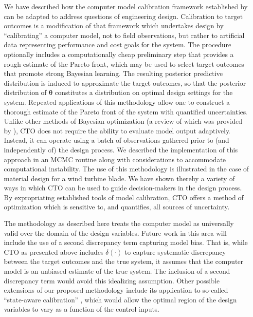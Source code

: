 \documentclass[12pt]{article}
\begin{document}
We have described how the 
computer model calibration framework established by \cite{Kennedy2001} can be adapted to address questions of engineering design. 
%
Calibration to target outcomes is a modification of that framework which undertakes design by ``calibrating'' a computer model, not to field observations, but rather to artificial data representing performance and cost goals for the system. 
%
The procedure optionally includes a computationally cheap preliminary step that provides a rough estimate of the Pareto front, which may be used to select target outcomes that promote strong Bayesian learning.
%
The resulting posterior predictive distribution is induced to approximate the target outcomes, so that the posterior distribution of $\boldsymbol\theta$ constitutes a distribution on optimal design settings for the system.
%
Repeated applications of this methodology allow one to construct a thorough estimate of the Pareto front of the system with quantified uncertainties.
%
Unlike other methods of Bayesian optimization (a review of which was provided by \citealt{Shahriari2016}), CTO does not require the ability to evaluate model output adaptively.
%
Instead, it can operate using a batch of observations gathered prior to (and independently of) the design process.
%
We described the implementation of this approach in an MCMC routine along with considerations to accommodate computational instability.
%
The use of this methodology is illustrated in the case of material design for a wind turbine blade. 
%
We have shown thereby a variety of ways in which CTO can be used to guide decision-makers in the design process. 
%
By expropriating established tools of model calibration, CTO offers a method of optimization which is sensitive to, and quantifies, all sources of uncertainty.
%

%
The methodology as described here treats the computer model as universally valid over the domain of the design variables. 
%
Future work in this area will include the use of a second discrepancy term capturing model bias.
%
That is, while CTO as presented above includes $\delta(\cdot)$ to capture systematic discrepancy between the target outcomes and the true system, it assumes that the computer model is an unbiased estimate of the true system.
%
The inclusion of a second discrepancy term would avoid this idealizing assumption.
%
Other possible extensions of our proposed methodology include its application to so-called ``state-aware calibration'' \citep{Atamturktur2015,Stevens2018,Brown2016}, which would allow the optimal region of the design variables to vary as a function of the control inputs.
\end{document}
